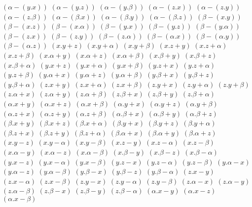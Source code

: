 $ (\alpha - (y . x)) $
$ (\alpha - (y . z)) $
$ (\alpha - (y . \beta)) $
$ (\alpha - (z . x)) $
$ (\alpha - (z . y)) $
$ (\alpha - (z . \beta)) $
$ (\alpha - (\beta . x)) $
$ (\alpha - (\beta . y)) $
$ (\alpha - (\beta . z)) $
$ (\beta - (x . y)) $
$ (\beta - (x . z)) $
$ (\beta - (x . \alpha)) $
$ (\beta - (y . x)) $
$ (\beta - (y . z)) $
$ (\beta - (y . \alpha)) $
$ (\beta - (z . x)) $
$ (\beta - (z . y)) $
$ (\beta - (z . \alpha)) $
$ (\beta - (\alpha . x)) $
$ (\beta - (\alpha . y)) $
$ (\beta - (\alpha . z)) $
$ (x . y + z) $
$ (x . y + \alpha) $
$ (x . y + \beta) $
$ (x . z + y) $
$ (x . z + \alpha) $
$ (x . z + \beta) $
$ (x . \alpha + y) $
$ (x . \alpha + z) $
$ (x . \alpha + \beta) $
$ (x . \beta + y) $
$ (x . \beta + z) $
$ (x . \beta + \alpha) $
$ (y . x + z) $
$ (y . x + \alpha) $
$ (y . x + \beta) $
$ (y . z + x) $
$ (y . z + \alpha) $
$ (y . z + \beta) $
$ (y . \alpha + x) $
$ (y . \alpha + z) $
$ (y . \alpha + \beta) $
$ (y . \beta + x) $
$ (y . \beta + z) $
$ (y . \beta + \alpha) $
$ (z . x + y) $
$ (z . x + \alpha) $
$ (z . x + \beta) $
$ (z . y + x) $
$ (z . y + \alpha) $
$ (z . y + \beta) $
$ (z . \alpha + x) $
$ (z . \alpha + y) $
$ (z . \alpha + \beta) $
$ (z . \beta + x) $
$ (z . \beta + y) $
$ (z . \beta + \alpha) $
$ (\alpha . x + y) $
$ (\alpha . x + z) $
$ (\alpha . x + \beta) $
$ (\alpha . y + x) $
$ (\alpha . y + z) $
$ (\alpha . y + \beta) $
$ (\alpha . z + x) $
$ (\alpha . z + y) $
$ (\alpha . z + \beta) $
$ (\alpha . \beta + x) $
$ (\alpha . \beta + y) $
$ (\alpha . \beta + z) $
$ (\beta . x + y) $
$ (\beta . x + z) $
$ (\beta . x + \alpha) $
$ (\beta . y + x) $
$ (\beta . y + z) $
$ (\beta . y + \alpha) $
$ (\beta . z + x) $
$ (\beta . z + y) $
$ (\beta . z + \alpha) $
$ (\beta . \alpha + x) $
$ (\beta . \alpha + y) $
$ (\beta . \alpha + z) $
$ (x . y - z) $
$ (x . y - \alpha) $
$ (x . y - \beta) $
$ (x . z - y) $
$ (x . z - \alpha) $
$ (x . z - \beta) $
$ (x . \alpha - y) $
$ (x . \alpha - z) $
$ (x . \alpha - \beta) $
$ (x . \beta - y) $
$ (x . \beta - z) $
$ (x . \beta - \alpha) $
$ (y . x - z) $
$ (y . x - \alpha) $
$ (y . x - \beta) $
$ (y . z - x) $
$ (y . z - \alpha) $
$ (y . z - \beta) $
$ (y . \alpha - x) $
$ (y . \alpha - z) $
$ (y . \alpha - \beta) $
$ (y . \beta - x) $
$ (y . \beta - z) $
$ (y . \beta - \alpha) $
$ (z . x - y) $
$ (z . x - \alpha) $
$ (z . x - \beta) $
$ (z . y - x) $
$ (z . y - \alpha) $
$ (z . y - \beta) $
$ (z . \alpha - x) $
$ (z . \alpha - y) $
$ (z . \alpha - \beta) $
$ (z . \beta - x) $
$ (z . \beta - y) $
$ (z . \beta - \alpha) $
$ (\alpha . x - y) $
$ (\alpha . x - z) $
$ (\alpha . x - \beta) $
